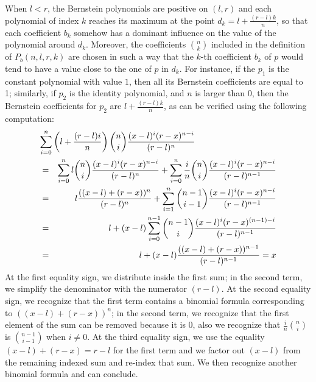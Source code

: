 \documentclass{mscs}
\begin{document}
When \(l < r\), the Bernstein polynomials are positive on $(l, r)$ and
each polynomial
of index \(k\) reaches its maximum at the point \(d_k=l+\frac{(r-l)k}{n}\), so
that each coefficient \(b_k\) somehow has a dominant influence on the value
of the polynomial around \(d_k\).  Moreover, the coefficients
\(\binom{n}{k}\) included in the definition of \(P_b(n,l,r,k)\) are chosen
in such a way that the $k$-th coefficient \(b_k\) of $p$ would tend to
have a value
close to the one of $p$  in \(d_k\).  For instance, if the
\(p_1\) is the constant polynomial with value \(1\), then all its Bernstein
coefficients are equal to 1; similarly, if \(p_2\) is the identity polynomial,
and \(n\) is larger than \(0\),
then the Bernstein coefficients for \(p_2\)
are \(l + \frac{(r-l) k}{n}\), as can
be verified using the following computation:
\begin{eqnarray*}
\lefteqn{\sum_{i=0}^n \left(l + \frac{(r-l)i}{n}\right) \binom{n}{i} \frac{(x-l)^i (r-x)^{n-i}}
{(r-l)^n}}\\
&=& \sum_{i=0}^n l \binom{n}{i}\frac{(x-l)^i(r-x)^{n-i}}{(r-l)^n} +
\sum_{i=0}^n \frac{i}{n}\binom{n}{i}\frac{(x-l)^i(r-x)^{n-i}}{(r-l)^{n-1}}\\
&=& l \frac{((x -l) + (r - x))^n}{(r-l)^n} +\sum_{i=1}^n \binom{n-1}{i-1}\frac{(x-l)^i(r-x)^{n-i}}{(r-l)^{n-1}}\\
&=& l +{ (x-l)\sum_{i=0}^{n-1}\binom{n-1}{i} \frac{(x-l)^i(r-x)^{(n-1)-i}}
{(r-l)^{n-1}}}\\
&=& l + (x -l) \frac{((x-l) + (r - x))^{n-1}}{(r-l)^{n-1}} = x
\end{eqnarray*}
At the first equality sign, we distribute inside the first sum; in the
second term, we simplify the denominator with the numerator \((r-l)\).
At the second equality sign, we recognize that the first term contains
a binomial formula corresponding to \(((x-l)+(r-x))^n\); in the second
term, we recognize that the first element of the sum can be removed
because it is 0, also we recognize that \(\frac{i}{n}\binom{n}{i}\) is
\(\binom{n-1}{i-1}\) when \(i\neq 0\).  At the third equality sign,
we use the equality \((x-l)+(r-x)=r-l\) for the first term and
we factor out \((x-l)\) from the remaining indexed sum and re-index that sum.
We then recognize another binomial formula and can conclude.
\end{document}
